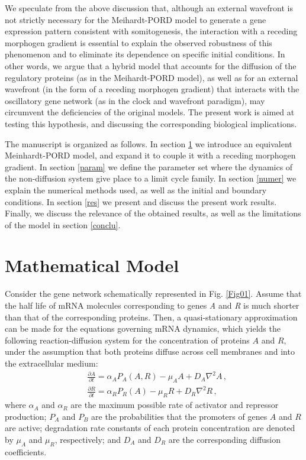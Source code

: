 \documentclass[%
 preprint,
 aip, 
 amsmath,amssymb,
]{revtex4-2}
\begin{document}
We speculate from the above discussion that, although an external wavefront is not strictly necessary for the Meihardt-PORD model to generate a gene expression pattern consistent with somitogenesis, the interaction with a receding morphogen gradient is essential to explain the observed robustness of this phenomenon and to eliminate its dependence on specific initial conditions. In other words, we argue that a hybrid model that accounts for the diffusion of the regulatory proteins (as in the Meihardt-PORD model), as well as for an external wavefront (in the form of a receding morphogen gradient) that interacts with the oscillatory gene network (as in the clock and wavefront paradigm), may circumvent the deficiencies of the original models. The present work is aimed at testing this hypothesis, and discussing the corresponding biological implications.
	
The manuscript is organized as follows. In section \ref{model} we introduce an equivalent Meinhardt-PORD model, and expand it to couple it with a receding morphogen gradient. In section \ref{param} we define the parameter set where the dynamics of the non-diffusion system give place to a limit cycle family. In section \ref{numer} we explain the numerical methods used, as well as the initial and boundary conditions. In section \ref{res} we present and discuss the present work results. Finally, we discuss the relevance of the obtained results, as well as the limitations of the model in section \ref{conclu}.
	
	\section{Mathematical Model}
	\label{model}
	
Consider the gene network schematically represented in Fig. \ref{Fig01}. Assume that the half life of mRNA molecules corresponding to genes \textit{A} and \textit{R} is much shorter than that of the corresponding proteins. Then, a quasi-stationary approximation can be made for the equations governing mRNA dynamics, which yields the following reaction-diffusion system for the concentration of proteins $A$ and $R$, under the assumption that both proteins diffuse across cell membranes and into the extracellular medium:
	\begin{subequations}\label{eq012}
		\begin{flalign}
		& \frac{\partial A}{\partial t} = \alpha_A P_A (A, R) - \mu_A A + D_A \nabla^2 A\,,
		\label{eq01} \\
		& \frac{\partial R}{\partial t} = \alpha_R P_R (A) - \mu_R R + D_R \nabla^2 R\,,
		\label{eq02}
		\end{flalign}
	\end{subequations}
where $\alpha_A$ and $\alpha_R$ are the maximum possible rate of activator and repressor production; $P_A$ and $P_B$ are the probabilities that the promoters of genes $A$ and $R$ are active; degradation rate constants of each protein concentration are denoted by $\mu_A$ and $\mu_R$, respectively; and $D_A$ and $D_R$ are the corresponding diffusion coefficients.
\end{document}
